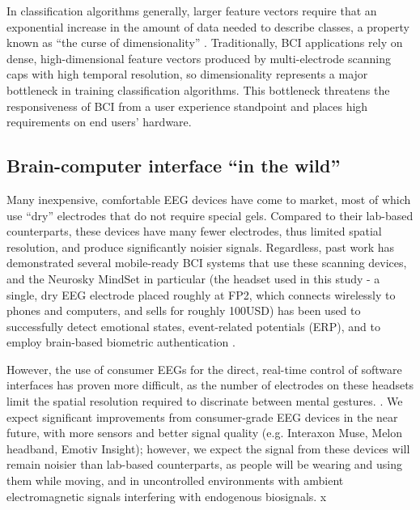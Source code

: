 In classification algorithms generally, larger feature vectors require that an exponential increase in the amount of data needed to describe classes, a property known as ``the curse of dimensionality'' \cite{jain_statistical_2000,raudys_small_1991}. Traditionally, BCI applications rely on dense, high-dimensional feature vectors produced by multi-electrode scanning caps with high temporal resolution, so dimensionality represents a major bottleneck in training classification algorithms. This bottleneck threatens the responsiveness of BCI from a user experience standpoint and places high requirements on end users' hardware.

\subsection{Brain-computer interface ``in the wild''}

\noindent Many inexpensive, comfortable EEG devices have come to market, most of which use ``dry'' electrodes that do not require special gels. Compared to their lab-based counterparts, these devices have many fewer electrodes, thus limited spatial resolution, and produce significantly noisier signals. \cite{de2014mobile} Regardless, past work has demonstrated several mobile-ready BCI systems that use these scanning devices, and the Neurosky MindSet in particular (the headset used in this study - a single, dry EEG electrode placed roughly at FP2, which connects wirelessly to phones and computers, and sells for roughly 100USD) has been used to successfully detect emotional states, event-related potentials (ERP), and to employ brain-based biometric authentication \cite{crowley_evaluating_2010,grierson_better_2011,adams_i_2013}.  

However, the use of consumer EEGs for the direct, real-time control of software interfaces has proven more difficult, as the number of electrodes on these headsets limit the spatial resolution required to discrinate between mental gestures. \cite{carrino_self-paced_2012,larsen_classification_2011}. We expect significant improvements from consumer-grade EEG devices in the near future, with more sensors and better signal quality (e.g. Interaxon Muse, Melon headband, Emotiv Insight); however, we expect the signal from these devices will remain noisier than lab-based counterparts, as people will be wearing and using them while moving, and in uncontrolled environments with ambient electromagnetic signals interfering with endogenous biosignals. x

